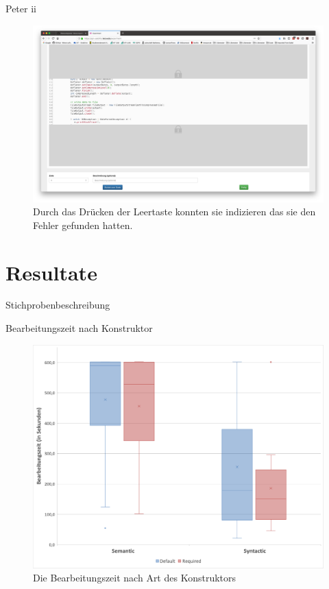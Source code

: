 \documentclass[10pt]{beamer}
\begin{document}
	\begin{frame}{Peter  ii}	
		\begin{figure}
			\includegraphics[scale=0.15]{graphics/peter_correction.png}
			\caption{\label{fig:peter_correction.png} Durch das Drücken der Leertaste konnten sie indizieren das sie den Fehler gefunden hatten.}
		\end{figure}
	\end{frame}

\section{Resultate}

	\begin{frame}{Stichprobenbeschreibung}
	 
	\end{frame}

	\begin{frame}{Bearbeitungszeit nach Konstruktor}
		\begin{figure}
			\includegraphics[scale=0.32]{graphics/box_time-constructor.png}
			\caption{\label{fig:box_time-constructor.png} Die Bearbeitungszeit nach Art des Konstruktors}
		\end{figure}
	\end{frame}
\end{document}
